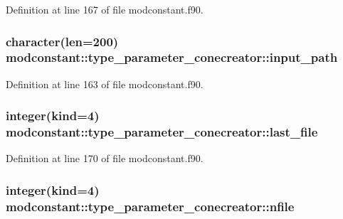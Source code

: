 Definition at line 167 of file modconstant.\+f90.

\subsubsection[{\texorpdfstring{input\+\_\+path}{input_path}}]{\setlength{\rightskip}{0pt plus 5cm}character(len=200) modconstant\+::type\+\_\+parameter\+\_\+conecreator\+::input\+\_\+path}\hypertarget{structmodconstant_1_1type__parameter__conecreator_ac382f8cfe1347c4242bded522f3206df}{}\label{structmodconstant_1_1type__parameter__conecreator_ac382f8cfe1347c4242bded522f3206df}


Definition at line 163 of file modconstant.\+f90.

\subsubsection[{\texorpdfstring{last\+\_\+file}{last_file}}]{\setlength{\rightskip}{0pt plus 5cm}integer(kind=4) modconstant\+::type\+\_\+parameter\+\_\+conecreator\+::last\+\_\+file}\hypertarget{structmodconstant_1_1type__parameter__conecreator_a23caca71a8dc1b330de47e8a6873012e}{}\label{structmodconstant_1_1type__parameter__conecreator_a23caca71a8dc1b330de47e8a6873012e}


Definition at line 170 of file modconstant.\+f90.

\subsubsection[{\texorpdfstring{nfile}{nfile}}]{\setlength{\rightskip}{0pt plus 5cm}integer(kind=4) modconstant\+::type\+\_\+parameter\+\_\+conecreator\+::nfile}\hypertarget{structmodconstant_1_1type__parameter__conecreator_aed8367ffd7693e23e246b114eb3eef88}{}\label{structmodconstant_1_1type__parameter__conecreator_aed8367ffd7693e23e246b114eb3eef88}


